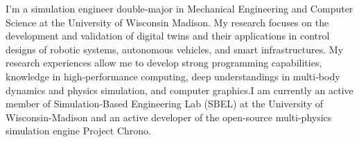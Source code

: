 

\begin{cvparagraph}

I’m a simulation engineer double‑major in Mechanical Engineering and Computer Science at the University of Wisconsin Madison. My research focuses on the development and validation of digital twins and their applications in control designs of robotic systems, autonomous vehicles, and smart infrastructures. My research experiences allow me to develop strong programming capabilities, knowledge in high‑performance computing, deep understandings in multi‑body dynamics and physics simulation, and computer graphics.I am currently an active member of Simulation-Based Engineering Lab (SBEL) at the University of Wisconsin-Madison and an active developer of the open-source multi-physics simulation engine Project Chrono.\\


\end{cvparagraph}